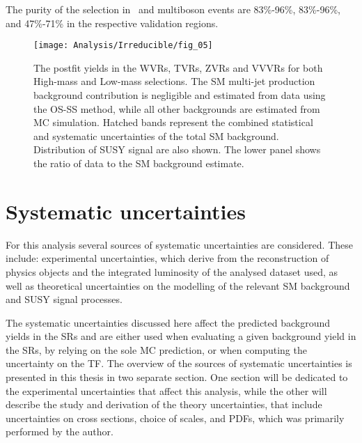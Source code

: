 	The purity of the selection in \Zjets\, \ttbar and multiboson events are 83\%-96\%, 83\%-96\%, and 47\%-71\% in the respective validation regions. 
	\begin{figure}[!hbt]
		\centering
		\texttt{[image: Analysis/Irreducible/fig\_05]}
		\caption{The postfit yields in the WVRs, TVRs, ZVRs  and VVVRs for both High-mass and Low-mass selections. The \ac{SM} multi-jet production background contribution is negligible and estimated from data using the OS-SS method, while all other backgrounds are estimated from  \ac{MC} simulation. Hatched bands represent the combined statistical and systematic uncertainties of the total \ac{SM} background. Distribution of \ac{SUSY} signal are also shown. The lower panel shows the ratio of data to the \ac{SM} background estimate.}
	\label{fig:irreducible_VRs}
	\end{figure}	
	
	\section{Systematic uncertainties}
	\label{sec:syst_unc}
	For this analysis several sources of systematic uncertainties are considered. These include: experimental uncertainties, which derive from the reconstruction of physics objects and the integrated luminosity of the analysed dataset used, as well as theoretical uncertainties on the modelling of the relevant \ac{SM} background and \ac{SUSY} signal processes.  
	
	The systematic uncertainties discussed here affect the predicted background yields in the \acp{SR} and are either used when evaluating a given background yield in the \acp{SR}, by relying on the sole \ac{MC} prediction, or when computing the uncertainty on the \ac{TF}.
	The overview of the sources of systematic uncertainties is presented in this thesis in two separate section. 
	One section will be dedicated to the experimental uncertainties that affect this analysis, while the other will describe the study and derivation of the theory uncertainties, that include uncertainties on cross sections, choice of scales, and \acp{PDF}, which was primarily performed by the author. 
